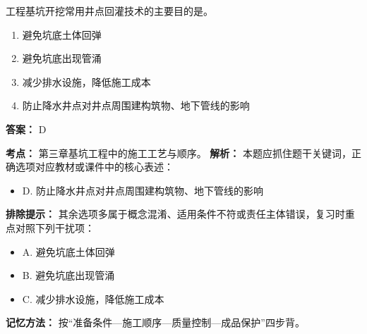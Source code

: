 \documentclass[UTF8,fontset=fandol,11pt]{ctexart}
\begin{document}
\vspace{0.2em}

\begin{quizbox}[title={第 18 题}]
工程基坑开挖常用井点回灌技术的主要目的是。\\
\begin{enumerate}[label=\Alph*.]
\item 避免坑底土体回弹
\item 避免坑底出现管涌
\item 减少排水设施，降低施工成本
\item 防止降水井点对井点周围建构筑物、地下管线的影响
\end{enumerate}
\textbf{答案：} D
\vspace{0.25em}
\begin{answerbox}[title={考点解析}]
\textbf{考点：} 第三章基坑工程中的施工工艺与顺序。
\textbf{解析：} 本题应抓住题干关键词，正确选项对应教材或课件中的核心表述：
\begin{itemize}
\item D. 防止降水井点对井点周围建构筑物、地下管线的影响
\end{itemize}
\textbf{排除提示：} 其余选项多属于概念混淆、适用条件不符或责任主体错误，复习时重点对照下列干扰项：
\begin{itemize}
\item A. 避免坑底土体回弹
\item B. 避免坑底出现管涌
\item C. 减少排水设施，降低施工成本
\end{itemize}
\textbf{记忆方法：} 按“准备条件—施工顺序—质量控制—成品保护”四步背。
\end{answerbox}
\end{quizbox}

\vspace{0.2em}
\end{document}
